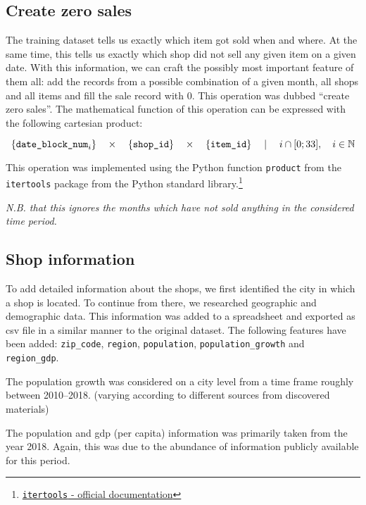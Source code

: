 \subsection{Create zero sales}\label{zerosales}

The training dataset tells us exactly which item got sold when and where. At the same time, this tells us exactly which shop did not sell any given item on a given date.
With this information, we can craft the possibly most important feature of them all: add the records from a possible combination of a given month, all shops and all items and fill the sale record with 0. This operation was dubbed \enquote{create zero sales}.
The mathematical function of this operation can be expressed with the following cartesian product:

\vspace*{-4mm}
$$
\{\text{\texttt{date\_block\_num}}_i\}
\quad \times \quad
\{{\text{\texttt{shop\_id}}}\}
\quad  \times \quad 
\{{\text{\texttt{item\_id}}}\}
\quad \mid \quad
i \cap [0; 33], \quad i \in \mathbb{N}
$$

This operation was implemented using the Python function \texttt{product} from the \texttt{itertools} package from the Python standard library.\footnote{\href{https://docs.python.org/3/library/itertools.html\#itertools.product}{\texttt{itertools} - official documentation}}

\noindent \textit{N.B. that this ignores the months which have not sold anything in the considered time period.}

\subsection{Shop information}

To add detailed information about the shops, we first identified the city in which a shop is located. To continue from there, we researched geographic and demographic data. This information was added to a spreadsheet and exported as \acrfull{csv} file in a similar manner to the original dataset. The following features have been added: \texttt{zip\_code}, \texttt{region}, \texttt{population}, \texttt{population\_growth} and \texttt{region\_gdp}.

The population growth was considered on a city level from a time frame roughly between 2010--2018. (varying according to different sources from discovered materials)

The population and gdp (per capita) information was primarily taken from the year 2018. Again, this was due to the abundance of information publicly available for this period.

